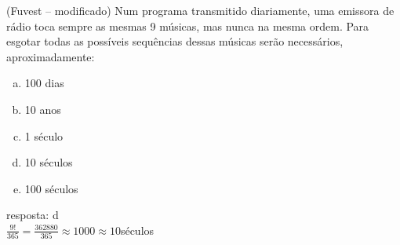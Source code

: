 \begin{ex}
 (Fuvest – modificado) Num programa transmitido diariamente, uma emissora de rádio toca sempre as mesmas 9 músicas, mas nunca na mesma ordem. Para esgotar todas as possíveis sequências dessas músicas serão necessários, aproximadamente:
    \begin{enumerate}[(a)]
    \item 100 dias
    \item 10 anos
    \item 1 século
    \item 10 séculos
    \item 100 séculos
    \end{enumerate}
      \begin{sol}
        resposta: d  \\
        $\frac{9!}{365}= \frac{362880}{365}\approx 1000\approx10$\hspace{0,1cm}séculos
      \end{sol}
\end{ex}